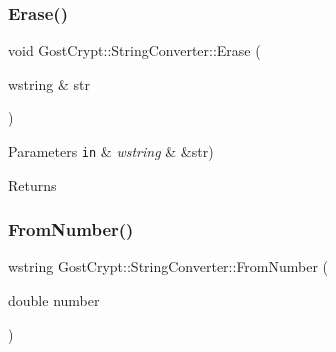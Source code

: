 \subsubsection{\texorpdfstring{Erase()}{Erase()}\hspace{0.1cm}{\footnotesize\ttfamily [2/2]}}
{\footnotesize\ttfamily void Gost\+Crypt\+::\+String\+Converter\+::\+Erase (\begin{DoxyParamCaption}\item[{wstring \&}]{str }\end{DoxyParamCaption})\hspace{0.3cm}{\ttfamily [static]}}


\begin{DoxyParams}[1]{Parameters}
\mbox{\tt in}  & {\em wstring} & \&str) \\
\hline
\end{DoxyParams}
\begin{DoxyReturn}{Returns}

\end{DoxyReturn}
\mbox{\label{class_gost_crypt_1_1_string_converter_af2aafa018883a06911693cfa6cf051ee}} 
\subsubsection{\texorpdfstring{From\+Number()}{FromNumber()}\hspace{0.1cm}{\footnotesize\ttfamily [1/5]}}
{\footnotesize\ttfamily wstring Gost\+Crypt\+::\+String\+Converter\+::\+From\+Number (\begin{DoxyParamCaption}\item[{double}]{number }\end{DoxyParamCaption})\hspace{0.3cm}{\ttfamily [static]}}


